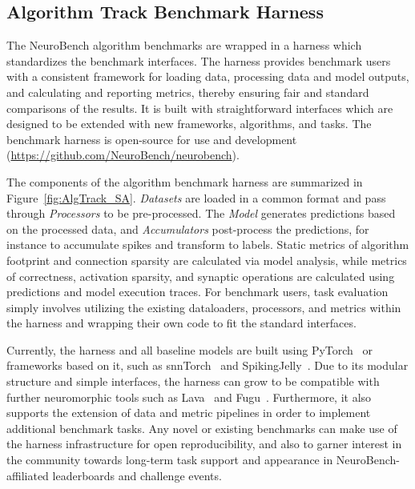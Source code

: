 \subsection*{Algorithm Track Benchmark Harness}
    The NeuroBench algorithm benchmarks are wrapped in a harness which standardizes the benchmark interfaces. The harness provides benchmark users with a consistent framework for loading data, processing data and model outputs, and calculating and reporting metrics, thereby ensuring fair and standard comparisons of the results. It is built with straightforward interfaces which are designed to be extended with new frameworks, algorithms, and tasks. The benchmark harness is open-source for use and development (\url{https://github.com/NeuroBench/neurobench}).
    
    The components of the algorithm benchmark harness are summarized in Figure~\ref{fig:AlgTrack_SA}.
    \textit{Datasets} are loaded in a common format and pass through \textit{Processors} to be pre-processed. The \textit{Model} generates predictions based on the processed data, and \textit{Accumulators} post-process the predictions, for instance to accumulate spikes and transform to labels. Static metrics of algorithm footprint and connection sparsity are calculated via model analysis, while metrics of correctness, activation sparsity, and synaptic operations are calculated using predictions and model execution traces. For benchmark users, task evaluation simply involves utilizing the existing dataloaders, processors, and metrics within the harness and wrapping their own code to fit the standard interfaces.
 
    Currently, the harness and all baseline models are built using PyTorch~\cite{paszke19pytorch} or frameworks based on it, such as snnTorch~\cite{eshraghian2021training} and SpikingJelly~\cite{SpikingJelly}. Due to its modular structure and simple interfaces, the harness can grow to be compatible with further neuromorphic tools such as Lava~\cite{lava} and Fugu~\cite{aimone2019composing}.
    Furthermore, it also supports the extension of data and metric pipelines in order to implement additional benchmark tasks.  Any novel or existing benchmarks can make use of the harness infrastructure for open reproducibility, and also to garner interest in the community towards long-term task support and appearance in NeuroBench-affiliated leaderboards and challenge events.

